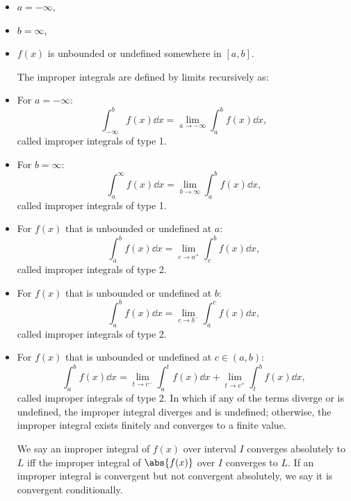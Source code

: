 \documentclass[a4paper,12pt]{report}
\begin{document}
\begin{itemize}
\begin{itemize}
\subsubsection{Darboux integral}
Let $f$ be a real-valued function defined on a interval $[a,b]$. The Darboux integral of $f$ on $[a,b]$ exists and equals $s$ if for all $\varepsilon > 0$, there exists $\delta > 0$ such that for any partition $P$ whose mesh is less than $\delta$,
\[\abs{U(f,P)-s}<\varepsilon \land \abs{L(f,P)-s}<\varepsilon.\]
\subsection{Extensions of Riemann integral}
\subsubsection{Improper (Riemann) integral (瑕（黎曼）積分)}
An integral $\int _{a}^{b}f(x)\dd{x}$ is an improper integral if it satisfies one or more of the below conditions:
\ben
\item $a=-\infty$,
\item $b=\infty$,
\item $f(x)$ is unbounded or undefined somewhere in $[a,b]$.
\een

The improper integrals are defined by limits recursively as:
\bit
\item For $a=-\infty$:
\[\int _{-\infty }^bf(x)\dd{x}=\lim _{a\to -\infty }\int _{a}^{b}f(x)\dd{x},\]
called improper integrals of type 1.
\item For $b=\infty$:
\[\int _{a}^{\infty }f(x)\dd{x}=\lim _{b\to \infty }\int _{a}^{b}f(x)\dd{x},\]
called improper integrals of type 1.
\item For $f(x)$ that is unbounded or undefined at $a$:
\[\int_a^bf(x)\dd{x}=\lim_{c\to a^+}\int_c^bf(x)\dd{x},\]
called improper integrals of type 2.
\item For $f(x)$ that is unbounded or undefined at $b$:
\[\int_a^bf(x)\dd{x}=\lim_{c\to b^-}\int_a^cf(x)\dd{x},\]
called improper integrals of type 2.
\item For $f(x)$ that is unbounded or undefined at $c\in(a,b)$:
\[\int _{a}^{b}f(x)\dd{x}=\lim_{t\to c^-}\int _{a}^{t}f(x)\dd{x}+\lim_{t\to c^+}\int _{t}^{b}f(x)\dd{x},\]
called improper integrals of type 2.
\eit
In which if any of the terms diverge or is undefined, the improper integral diverges and is undefined; otherwise, the improper integral exists finitely and converges to a finite value.

We say an improper integral of $f(x)$ over interval $I$ converges absolutely to $L$ iff the improper integral of $\abs{f(x)}$ over $I$ converges to $L$. If an improper integral is convergent but not convergent absolutely, we say it is convergent conditionally.

\end{itemize}
\end{itemize}
\end{document}
